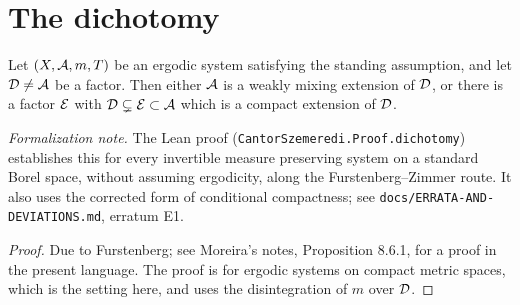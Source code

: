 \section{The dichotomy}

\begin{lemma}[Dichotomy]
  \label{lem:dichotomy}
  \leanok
  Let $(X,\mathcal{A},m,T)$ be an ergodic system satisfying the standing assumption, and let
  $\mathcal{D} \neq \mathcal{A}$ be a factor.  Then either $\mathcal{A}$ is a weakly mixing extension of $\mathcal{D}$, or
  there is a factor $\mathcal{E}$ with $\mathcal{D} \subsetneq \mathcal{E} \subset \mathcal{A}$ which is a compact extension
  of $\mathcal{D}$.
\end{lemma}
\emph{Formalization note.}  The Lean proof (\texttt{CantorSzemeredi.Proof.dichotomy}) establishes
this for every invertible measure preserving system on a standard Borel space, without assuming
ergodicity, along the Furstenberg--Zimmer route.  It also uses the corrected form of conditional
compactness; see \texttt{docs/ERRATA-AND-DEVIATIONS.md}, erratum E1.


\begin{proof}
  Due to Furstenberg; see Moreira's notes, Proposition 8.6.1, for a proof in the present
  language.  The proof is for ergodic systems on compact metric spaces, which is the setting
  here, and uses the disintegration of $m$ over $\mathcal{D}$.
\end{proof}

